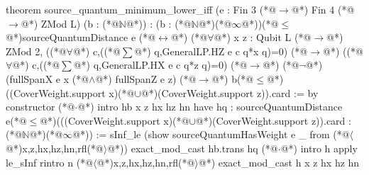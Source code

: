 theorem source_quantum_minimum_lower_iff (e : Fin 3 (*@$\to$@*) Fin 4 (*@$\to$@*) ZMod L) (b : (*@$\mathbb N$@*)) :
    (b : (*@$\mathbb N$@*)(*@$\infty$@*))(*@$\le$@*)sourceQuantumDistance e (*@$\leftrightarrow$@*)
      (*@$\forall$@*) x z : Qubit L (*@$\to$@*) ZMod 2,
        ((*@$\forall$@*) c,((*@$\sum$@*) q,GeneralLP.HZ e c q*x q)=0) (*@$\to$@*)
        ((*@$\forall$@*) c,((*@$\sum$@*) q,GeneralLP.HX e c q*z q)=0) (*@$\to$@*)
        (*@$\neg$@*)(fullSpanX e x (*@$\land$@*) fullSpanZ e z) (*@$\to$@*)
        b(*@$\le$@*)((CoverWeight.support x)(*@$\cup$@*)(CoverWeight.support z)).card := by
  constructor
  (*@$\cdot$@*) intro hb x z hx hz hn
    have hq : sourceQuantumDistance e(*@$\le$@*)(((CoverWeight.support x)(*@$\cup$@*)(CoverWeight.support z)).card : (*@$\mathbb N$@*)(*@$\infty$@*)) :=
      sInf_le (show sourceQuantumHasWeight e _ from (*@$\langle$@*)x,z,hx,hz,hn,rfl(*@$\rangle$@*))
    exact_mod_cast hb.trans hq
  (*@$\cdot$@*) intro h
    apply le_sInf
    rintro n (*@$\langle$@*)x,z,hx,hz,hn,rfl(*@$\rangle$@*)
    exact_mod_cast h x z hx hz hn
